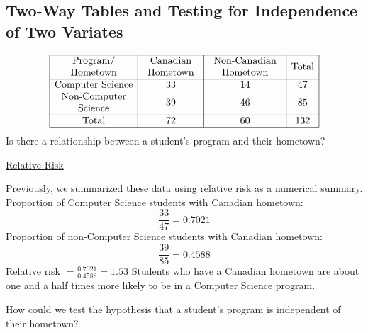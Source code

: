 \subsection{Two-Way Tables and Testing for Independence of Two Variates}

\[ \begin{array}{|c|c|c|c|}
        \hline \begin{array}{c}
            \text{Program/} \\
            \text{Hometown}
        \end{array} & \begin{array}{c}
            \text{Canadian} \\
            \text{Hometown}
        \end{array} & \begin{array}{c}
            \text{Non-Canadian} \\
            \text{Hometown}
        \end{array} & \text{Total} \\
        \hline \text{Computer Science}    & 33                         & 14                         & 47           \\
        \begin{array}{c}
            \text{Non-Computer} \\
            \text{Science}
        \end{array}        & 39                         & 46                         & 85           \\
        \hline \text{Total}               & 72                         & 60                         & 132          \\
        \hline
    \end{array} \]
Is there a relationship between a student's program and their hometown?

\underline{Relative Risk}

Previously, we summarized these data using relative risk as a numerical summary.
Proportion of Computer Science students with Canadian hometown:
\[
    \frac{33}{47}=0.7021
\]
Proportion of non-Computer Science students with Canadian hometown:
\[
    \frac{39}{85}=0.4588
\]
Relative risk $=\frac{0.7021}{0.4588}=1.53$
Students who have a Canadian hometown are about one and a half times more likely to be in a Computer Science program.

How could we test the hypothesis that a student's program is independent of their hometown?

